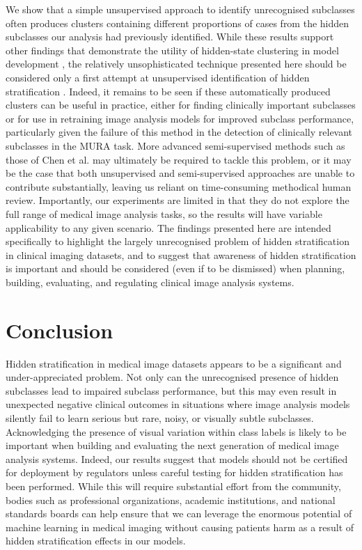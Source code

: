 \documentclass{article}
\begin{document}
We show that a simple unsupervised approach to identify unrecognised subclasses often produces clusters containing different proportions of cases from the hidden subclasses our analysis had previously identified. 
While these results support other findings that demonstrate the utility of hidden-state clustering in model development \citep{Liu2019-qt}, the relatively unsophisticated technique presented here should be considered only a first attempt at unsupervised identification of hidden stratification \citep{calinski1974dendrite, rousseeuw1987silhouettes}. 
Indeed, it remains to be seen if these automatically produced clusters can be useful in practice, either for finding clinically important subclasses or for use in retraining image analysis models for improved subclass performance, particularly given the failure of this method in the detection of clinically relevant subclasses in the MURA task. 
More advanced semi-supervised methods such as those of Chen et al. \citep{chen2019slicing} may ultimately be required to tackle this problem, or it may be the case that both unsupervised and semi-supervised approaches are unable to contribute substantially, leaving us reliant on time-consuming methodical human review.
Importantly, our experiments are limited in that they do not explore the full range of medical image analysis tasks, so the results will have variable applicability to any given scenario.
The findings presented here are intended specifically to highlight the largely unrecognised problem of hidden stratification in clinical imaging datasets, and to suggest that awareness of hidden stratification is important and should be considered (even if to be dismissed) when planning, building, evaluating, and regulating clinical image analysis systems.
 
\section{Conclusion}

Hidden stratification in medical image datasets appears to be a significant and under-appreciated problem. 
Not only can the unrecognised presence of hidden subclasses lead to impaired subclass performance, but this may even result in unexpected negative clinical outcomes in situations where image analysis models silently fail to learn serious but rare, noisy, or visually subtle subclasses.
Acknowledging the presence of visual variation within class labels is likely to be important when building and evaluating the next generation of medical image analysis systems.
Indeed, our results suggest that models should not be certified for deployment by regulators unless careful testing for hidden stratification has been performed.
While this will require substantial effort from the community, bodies such as professional organizations, academic institutions, and national standards boards can help ensure that we can leverage the enormous potential of machine learning in medical imaging without causing patients harm as a result of hidden stratification effects in our models.




\end{document}
